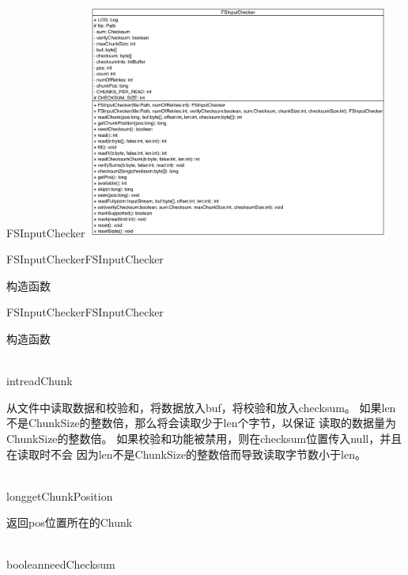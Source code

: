 \begin{XeClass}{FSInputChecker}
\includegraphics[width=10cm]{cdig/FSInputChecker.png}
    
    \begin{XeMethod}{\XeProtected}{FSInputChecker}{FSInputChecker}
         
 构造函数

    \end{XeMethod}

    \begin{XeMethod}{\XeProtected}{FSInputChecker}{FSInputChecker}
         
 构造函数

    \end{XeMethod}

    \begin{XeMethod}{\XeAbstract \\ \XeProtected}{int}{readChunk}
         
 从文件中读取数据和校验和，将数据放入buf，将校验和放入checksum。
 如果len不是ChunkSize的整数倍，那么将会读取少于len个字节，以保证
 读取的数据量为ChunkSize的整数倍。
 如果校验和功能被禁用，则在checksum位置传入null，并且在读取时不会
 因为len不是ChunkSize的整数倍而导致读取字节数小于len。

    \end{XeMethod}

    \begin{XeMethod}{\XeAbstract \\ \XeProtected}{long}{getChunkPosition}
         
 返回pos位置所在的Chunk

    \end{XeMethod}

    \begin{XeMethod}{\XeProtected \\ \XeSync}{boolean}{needChecksum}
         

\end{XeMethod}
\end{XeClass}
